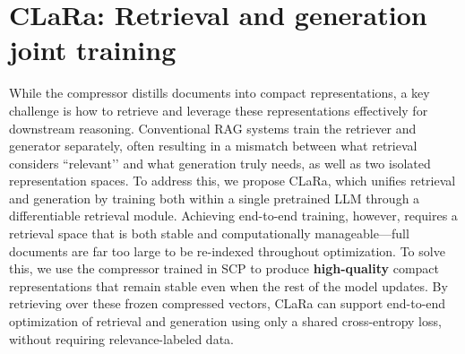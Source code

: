 \documentclass{applemlr}
\numberwithin{equation}{section}
\begin{document}
\section{CLaRa: Retrieval and generation joint training}

While the compressor distills documents into compact representations, a key challenge is how to retrieve and leverage these representations effectively for downstream reasoning. Conventional RAG systems train the retriever and generator separately, often resulting in a mismatch between what retrieval considers “relevant’’ and what generation truly needs, as well as two isolated representation spaces. To address this, we propose CLaRa, which unifies retrieval and generation by training both within a single pretrained LLM through a differentiable retrieval module. Achieving end-to-end training, however, requires a retrieval space that is both stable and computationally manageable—full documents are far too large to be re-indexed throughout optimization. To solve this, we use the compressor trained in SCP to produce \textbf{high-quality} compact representations that remain stable even when the rest of the model updates. By retrieving over these frozen compressed vectors, CLaRa can support end-to-end optimization of retrieval and generation using only a shared cross-entropy loss, without requiring relevance-labeled data.
\end{document}
